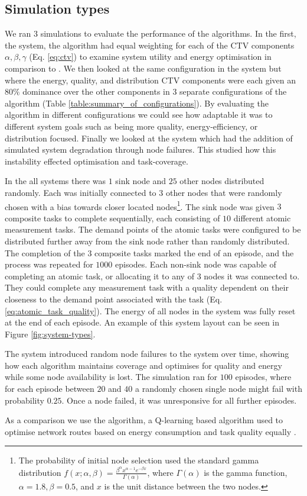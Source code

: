 \subsection{Simulation types}
We ran $3$ simulations to evaluate the performance of the algorithms. In the first, the \simulationSimple{}{} system,  the \acronymWSNOptimisation{}{} algorithm had
equal weighting for each of the CTV components $\alpha, \beta, \gamma$ (Eq. \ref{eq:ctv}) to examine system utility and energy optimisation in comparison to \acronymQRouting{}{}.  We then looked at the same configuration in the \simulationExtended{}{} system but where the energy, quality, and distribution CTV components were each given an $80\%$ dominance over the other components in $3$ separate configurations of the algorithm (Table \ref{table:summary_of_configurations}). By evaluating the algorithm in different configurations we could see how adaptable it was to different system goals such as being more quality, energy-efficiency, or distribution focused. Finally we looked at the \simulationNodeFailure{}{} system which had the addition of simulated system degradation through node failures. This studied how this instability effected optimisation and task-coverage.  

In the all systems there was  $1$ sink node and $25$ other nodes distributed randomly. Each was initially connected to $3$ other nodes that were randomly chosen with a bias towards closer located nodes\footnote{
		The probability of initial node selection used the standard gamma distribution $f(x; \alpha, \beta) = \frac{\beta^{\alpha} x^{\alpha-1}e^{- \beta x}}   {\Gamma(\alpha)}$, where $\Gamma(\alpha)$ is the  gamma function, $\alpha=1.8, \beta=0.5$, and $x$ is the unit distance between the two nodes.
	}. 
The sink node was given $3$ composite tasks to complete sequentially, each consisting of $10$ different atomic measurement tasks. The demand points of the atomic tasks were configured to be distributed further away from the sink node rather than randomly distributed. The completion of the $3$ composite tasks marked the end of an episode, and the process was repeated for $1000$ episodes. Each non-sink node was capable of completing an atomic task, or allocating it to any of $3$ nodes it was connected to. They could complete any measurement task with a quality dependent on their closeness to the demand point associated with the task (Eq. \ref{eq:atomic_task_quality}). The energy of all nodes in the system was fully reset at the end of each episode. An example of this system layout can be seen in Figure \ref{fig:system-types}. 

The \simulationNodeFailure{}{} system introduced random node failures to the system over time, showing how each algorithm maintains coverage and optimises for quality and energy while some node availability is lost. The simulation ran for $100$ episodes, where for each episode between $20$ and $40$  a randomly chosen single node might fail with probability $0.25$. Once a node failed, it was unresponsive for all further episodes. 

 As a comparison we use the \acronymQRouting{}{} algorithm, a Q-learning based algorithm  used to optimise network routes based on energy consumption and task quality equally \citep{XXX, XXX}.
